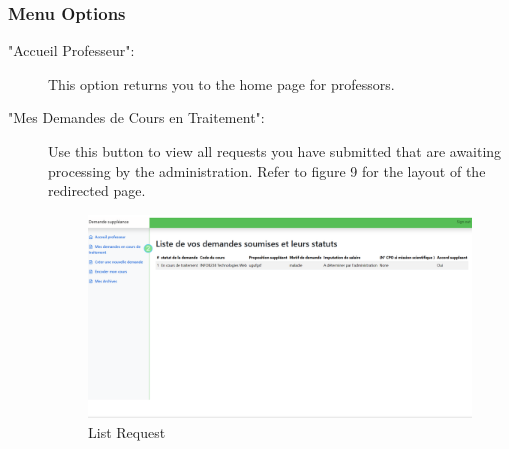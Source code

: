 \documentclass[12pt]{article}
\begin{document}
\subsubsection{Menu Options}\label{3}
\begin{description}
    \item[ 
"Accueil Professeur":] This option returns you to the home page for professors.

\item["Mes Demandes de Cours en Traitement":] Use this button to view all requests you have submitted that are awaiting processing by the administration. Refer to figure 9 for the layout of the redirected page.
\begin{figure}[H]
    \centering
    \includegraphics[width=0.75\linewidth]{image6.png}
    \caption{List Request}
\end{figure}


\end{description}
\end{document}
